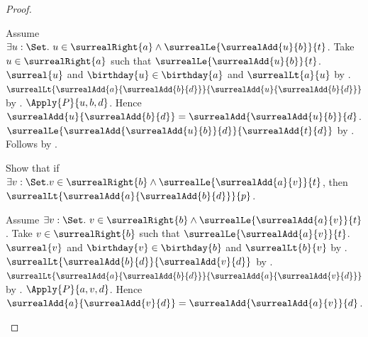 \begin{proof}
\begin{subproof}
\begin{subproof}
\begin{byCase}
                    \begin{subproof}
                        Assume $\exists u:\Set.\ u\in\surrealRight{a}\land
                            \surrealLe{\surrealAdd{u}{b}}{t}$.
                        Take $u\in\surrealRight{a}$ such that
                            $\surrealLe{\surrealAdd{u}{b}}{t}$.
                        $\surreal{u}$ and $\birthday{u}\in\birthday{a}$ and
                            $\surrealLt{a}{u}$
                            by .
                        $\surrealLt{\surrealAdd{a}{\surrealAdd{b}{d}}}
                            {\surrealAdd{u}{\surrealAdd{b}{d}}}$
                            by .
                        $\Apply{P}{u,b,d}$.
                        Hence $\surrealAdd{u}{\surrealAdd{b}{d}}=
                            \surrealAdd{\surrealAdd{u}{b}}{d}$.
                        $\surrealLe{\surrealAdd{\surrealAdd{u}{b}}{d}}
                            {\surrealAdd{t}{d}}$
                            by .
                        Follows by .
                    \end{subproof}
                    Show that if $\exists v:\Set.
                            v\in\surrealRight{b}\land
                            \surrealLe{\surrealAdd{a}{v}}{t}$, then
                        $\surrealLt{\surrealAdd{a}{\surrealAdd{b}{d}}}{p}$.
                    \begin{subproof}
                        Assume $\exists v:\Set.\ v\in\surrealRight{b}\land
                            \surrealLe{\surrealAdd{a}{v}}{t}$.
                        Take $v\in\surrealRight{b}$ such that
                            $\surrealLe{\surrealAdd{a}{v}}{t}$.
                        $\surreal{v}$ and $\birthday{v}\in\birthday{b}$ and
                            $\surrealLt{b}{v}$
                            by .
                        $\surrealLt{\surrealAdd{b}{d}}
                            {\surrealAdd{v}{d}}$
                            by .
                        $\surrealLt{\surrealAdd{a}{\surrealAdd{b}{d}}}
                            {\surrealAdd{a}{\surrealAdd{v}{d}}}$
                            by .
                        $\Apply{P}{a,v,d}$.
                        Hence $\surrealAdd{a}{\surrealAdd{v}{d}}=
                            \surrealAdd{\surrealAdd{a}{v}}{d}$.

\end{subproof}
\end{byCase}
\end{subproof}
\end{subproof}
\end{proof}
